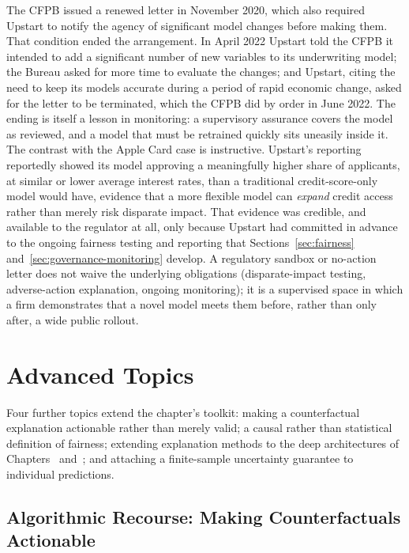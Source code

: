 \documentclass[../ai_in_finance]{subfiles}
\begin{document}
The CFPB issued a renewed letter in November 2020, which also required Upstart to notify the agency of significant model changes before making them. That condition ended the arrangement. In April 2022 Upstart told the CFPB it intended to add a significant number of new variables to its underwriting model; the Bureau asked for more time to evaluate the changes; and Upstart, citing the need to keep its models accurate during a period of rapid economic change, asked for the letter to be terminated, which the CFPB did by order in June 2022. The ending is itself a lesson in monitoring: a supervisory assurance covers the model as reviewed, and a model that must be retrained quickly sits uneasily inside it. The contrast with the Apple Card case is instructive. Upstart's reporting reportedly showed its model approving a meaningfully higher share of applicants, at similar or lower average interest rates, than a traditional credit-score-only model would have, evidence that a more flexible model can \emph{expand} credit access rather than merely risk disparate impact. That evidence was credible, and available to the regulator at all, only because Upstart had committed in advance to the ongoing fairness testing and reporting that Sections~\ref{sec:fairness} and~\ref{sec:governance-monitoring} develop. A regulatory sandbox or no-action letter does not waive the underlying obligations (disparate-impact testing, adverse-action explanation, ongoing monitoring); it is a supervised space in which a firm demonstrates that a novel model meets them before, rather than only after, a wide public rollout.

\section{Advanced Topics}
\label{sec:advanced-xai}

Four further topics extend the chapter's toolkit: making a counterfactual explanation actionable rather than merely valid; a causal rather than statistical definition of fairness; extending explanation methods to the deep architectures of Chapters~ and~; and attaching a finite-sample uncertainty guarantee to individual predictions.

\subsection{Algorithmic Recourse: Making Counterfactuals Actionable}
\label{sec:algorithmic-recourse}
\end{document}
